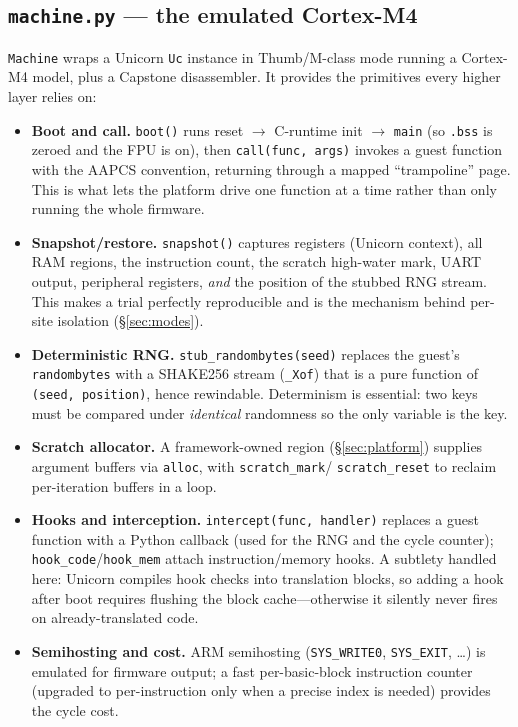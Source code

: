 \documentclass[11pt]{article}
\newcommand{\code}[1]{\texttt{#1}}
\begin{document}
\subsection{\code{machine.py} --- the emulated Cortex-M4}
\code{Machine} wraps a Unicorn \code{Uc} instance in Thumb/M-class mode running a
Cortex-M4 model, plus a Capstone disassembler. It provides the primitives every
higher layer relies on:

\begin{itemize}[leftmargin=1.4em]
  \item \textbf{Boot and call.} \code{boot()} runs reset $\to$ C-runtime init $\to$
  \code{main} (so \code{.bss} is zeroed and the FPU is on), then \code{call(func,
  args)} invokes a guest function with the AAPCS convention, returning through a
  mapped ``trampoline'' page. This is what lets the platform drive one function at
  a time rather than only running the whole firmware.
  \item \textbf{Snapshot/restore.} \code{snapshot()} captures registers (Unicorn
  context), all RAM regions, the instruction count, the scratch high-water mark,
  UART output, peripheral registers, \emph{and} the position of the stubbed RNG
  stream. This makes a trial perfectly reproducible and is the mechanism behind
  per-site isolation (\S\ref{sec:modes}).
  \item \textbf{Deterministic RNG.} \code{stub\_randombytes(seed)} replaces the
  guest's \code{randombytes} with a SHAKE256 stream (\code{\_Xof}) that is a pure
  function of \code{(seed, position)}, hence rewindable. Determinism is essential:
  two keys must be compared under \emph{identical} randomness so the only variable
  is the key.
  \item \textbf{Scratch allocator.} A framework-owned region (\S\ref{sec:platform})
  supplies argument buffers via \code{alloc}, with \code{scratch\_mark}/
  \code{scratch\_reset} to reclaim per-iteration buffers in a loop.
  \item \textbf{Hooks and interception.} \code{intercept(func, handler)} replaces a
  guest function with a Python callback (used for the RNG and the cycle counter);
  \code{hook\_code}/\code{hook\_mem} attach instruction/memory hooks. A subtlety
  handled here: Unicorn compiles hook checks into translation blocks, so adding a
  hook after boot requires flushing the block cache---otherwise it silently never
  fires on already-translated code.
  \item \textbf{Semihosting and cost.} ARM semihosting (\code{SYS\_WRITE0},
  \code{SYS\_EXIT}, \dots) is emulated for firmware output; a fast per-basic-block
  instruction counter (upgraded to per-instruction only when a precise index is
  needed) provides the cycle cost.
\end{itemize}
\end{document}
